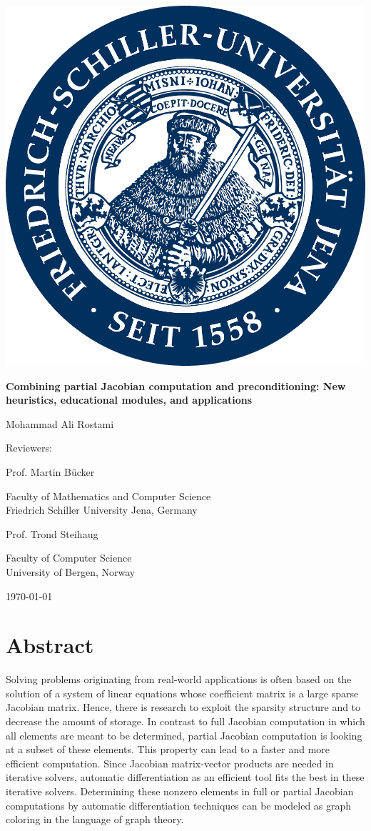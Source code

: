 \documentclass[12pt, twoside,a4paper,toc=bibliography]{scrbook}
\begin{document}
\begin{titlepage}
\centering
\includegraphics[width=0.3\linewidth]{logo}
\par
\vspace{1cm}
{\Large\textbf{Combining partial Jacobian computation and preconditioning: 
New heuristics, educational modules, and applications}\par}
\vspace{1cm}
{\Large Mohammad Ali Rostami\par}
\vspace{2cm}
{\large Reviewers:\par}
\vspace{0.6cm}
{\Large Prof. Martin B{\"u}cker\par}
{\Large Faculty of Mathematics and Computer Science\\Friedrich Schiller University Jena, Germany\par}
\vspace{1cm}
{\Large Prof. Trond Steihaug\par}
{\Large Faculty of Computer Science\\University of Bergen, Norway\par}
\vspace{1cm}
{\Large \today}
\end{titlepage}
\chapter*{Abstract}
Solving problems originating from real-world applications is often based
on the solution of a system of linear equations whose coefficient matrix is a large sparse Jacobian matrix.
Hence, there is research to exploit the sparsity structure and to decrease the amount of storage. 
In contrast to full Jacobian computation in which all elements are meant to be determined, 
partial Jacobian computation is looking at a subset of these elements. 
This property can lead to a faster and more efficient computation.
Since Jacobian matrix-vector products are needed in iterative solvers, automatic differentiation as an efficient tool fits
the best in these iterative solvers.
Determining these nonzero elements in full or partial Jacobian computations by automatic differentiation techniques
can be modeled as graph coloring in the language of graph theory.
\end{document}
